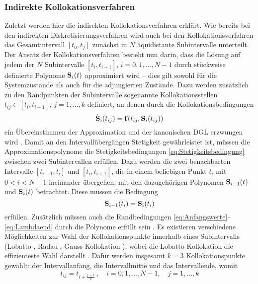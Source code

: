 \subsubsection{Indirekte Kollokationsverfahren}\label{subsubsec:Kollokationsverfahren_indirekt}
Zuletzt werden hier die indirekten Kollokationsverfahren erklärt. Wie bereits bei den indirekten Diskretisierungsverfahren wird auch bei den Kollokationsverfahren das Gesamtintervall $[t_0, t_f]$ zunächst in $N$ äquidistante Subintervalle unterteilt. Der Ansatz der Kollokationsverfahren besteht nun darin, dass die Lösung auf jedem der $N$ Subintervalle $[t_i, t_{i+1}],\, i = 0,1,...,N-1$ durch stückweise definierte Polynome $\boldsymbol{\mathrm{S}}_i(t)$ approximiert wird \cite{Gerdts.2010} -- dies gilt sowohl für die Systemzustände als auch für die adjungierten Zustände. Dazu werden zusätzlich zu den Randpunkten der Subintervalle sogenannte Kollokationsstellen $t_{ij} \in [t_i, t_{i+1}],\, j = 1,...,k$ definiert, an denen durch die Kollokationsbedingungen  
\begin{equation}
	\dot{\boldsymbol{\mathrm{S}}}_i(t_{ij}) = \boldsymbol{\mathrm{f}}(t_{ij},\boldsymbol{\mathrm{S}}_i(t_{ij})) \label{eq:Kollokationsbedingung}
\end{equation}
ein Übereinstimmen der Approximation und der kanonischen \gls{DGL} erzwungen wird \cite{Gerdts.2010}. Damit an den Intervallübergängen Stetigkeit gewährleistet ist, müssen die Approximationspolynome die Stetigkeitsbedingungen \eqref{eq:Stetigkeitsbedingung} zwischen zwei Subintervallen erfüllen. Dazu werden die zwei benachbarten Intervalle $[t_{i-1}, t_i]$ und $[t_i, t_{i+1}]$, die in einem beliebigen Punkt $t_i$ mit $0 < i < N-1$ ineinander übergehen, mit den dazugehörigen Polynomen $\boldsymbol{\mathrm{S}}_{i-1}(t)$ und $\boldsymbol{\mathrm{S}}_i(t)$ betrachtet. Diese müssen die Bedingung
\begin{equation}
\boldsymbol{\mathrm{S}}_{i-1}(t_i) = \boldsymbol{\mathrm{S}}_i(t_i) \label{eq:Stetigkeitsbedingung}
\end{equation} 
erfüllen. Zusätzlich müssen auch die Randbedingungen \eqref{eq:Anfangswerte}--\eqref{eq:Lambdaend} durch die Polynome erfüllt sein \cite{Gerdts.2010}. Es existieren verschiedene Möglichkeiten zur Wahl der Kollokationspunkte innerhalb eines Subintervalls (Lobatto-, Radau-, Gauss-Kollokation \cite{Weiss.1974}), wobei die Lobatto-Kollokation die effizienteste Wahl darstellt \cite{Weiss.1974}. Dafür werden insgesamt $k=3$ Kollokationspunkte gewählt: der Intervallanfang, die Intervallmitte und das Intervallende, womit 
\begin{equation}
	t_{ij} = t_{i+\frac{j-1}{2}}\,,\quad i = 0,1,...,N-1,\quad j = 1,...,k
\end{equation}
